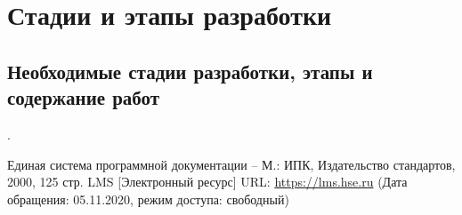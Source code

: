 \documentclass[a4paper,12pt,reqno]{article}
\begin{document}
						\newpage
	\section{Стадии и этапы разработки}
	
	\subsection{Необходимые стадии разработки, этапы и содержание работ}
	{\color{red}{TODO}}
	

						\newpage
	{\color{red}{TODO}}
						\newpage
	
	 \label{interface}
	{\color{red}{TODO}}.

						\newpage
	\begin{thebibliography}{3}
		Единая система программной документации – М.: ИПК, Издательство стандартов, 2000, 125 стр.
		LMS [Электронный ресурс] URL: 
		\url{https://lms.hse.ru} (Дата обращения: 05.11.2020, режим доступа: свободный)
		
	\end{thebibliography}

						\newpage
	\listRegistration
\end{document}
